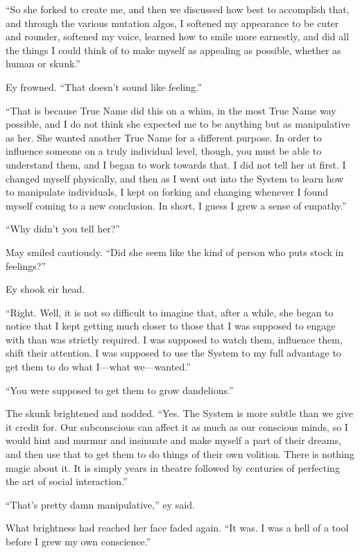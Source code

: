 ``So she forked to create me, and then we discussed how best to accomplish that, and through the various mutation algos, I softened my appearance to be cuter and rounder, softened my voice, learned how to smile more earnestly, and did all the things I could think of to make myself as appealing as possible, whether as human or skunk.''

Ey frowned. ``That doesn't sound like feeling.''

``That is because True Name did this on a whim, in the most True Name way possible, and I do not think she expected me to be anything but as manipulative as her. She wanted another True Name for a different purpose. In order to influence someone on a truly individual level, though, you must be able to understand them, and I began to work towards that. I did not tell her at first. I changed myself physically, and then as I went out into the System to learn how to manipulate individuals, I kept on forking and changing whenever I found myself coming to a new conclusion. In short, I guess I grew a sense of empathy.''

``Why didn't you tell her?''

May smiled cautiously. ``Did she seem like the kind of person who puts stock in feelings?''

Ey shook eir head.

``Right. Well, it is not so difficult to imagine that, after a while, she began to notice that I kept getting much closer to those that I was supposed to engage with than was strictly required. I was supposed to watch them, influence them, shift their attention. I was supposed to use the System to my full advantage to get them to do what I---what we---wanted.''

``You were supposed to get them to grow dandelions.''

The skunk brightened and nodded. ``Yes. The System is more subtle than we give it credit for. Our subconscious can affect it as much as our conscious minds, so I would hint and murmur and insinuate and make myself a part of their dreams, and then use that to get them to do things of their own volition. There is nothing magic about it. It is simply years in theatre followed by centuries of perfecting the art of social interaction.''

``That's pretty damn manipulative,'' ey said.

What brightness had reached her face faded again. ``It was. I was a hell of a tool before I grew my own conscience.''

